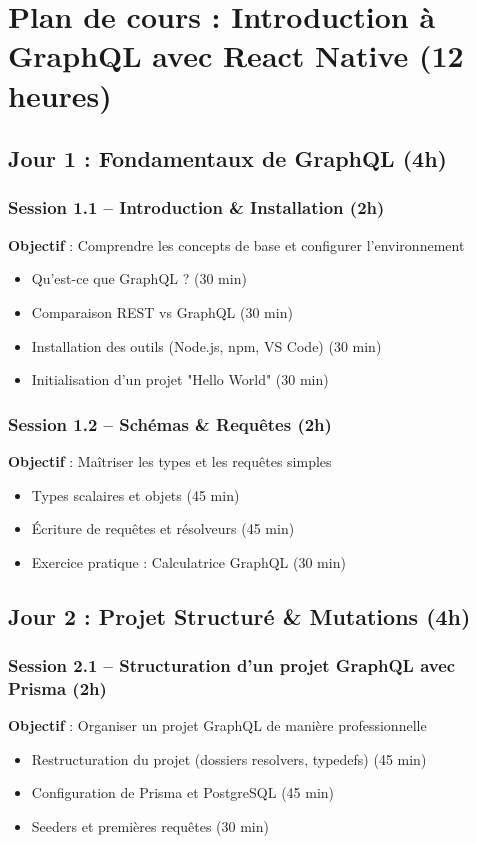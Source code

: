 \documentclass[12pt]{article}
\begin{document}
\section*{Plan de cours : Introduction à GraphQL avec React Native (12 heures)}

\subsection*{Jour 1 : Fondamentaux de GraphQL (4h)}

\subsubsection*{Session 1.1 – Introduction \& Installation (2h)}
\textbf{Objectif} : Comprendre les concepts de base et configurer l'environnement
\begin{itemize}
  \item Qu'est-ce que GraphQL ? (30 min)
  \item Comparaison REST vs GraphQL (30 min)
  \item Installation des outils (Node.js, npm, VS Code) (30 min)
  \item Initialisation d'un projet "Hello World" (30 min)
\end{itemize}

\vspace{0.3cm}
\subsubsection*{Session 1.2 – Schémas \& Requêtes (2h)}
\textbf{Objectif} : Maîtriser les types et les requêtes simples
\begin{itemize}
  \item Types scalaires et objets (45 min)
  \item Écriture de requêtes et résolveurs (45 min)
  \item Exercice pratique : Calculatrice GraphQL (30 min)
\end{itemize}

\vspace{0.5cm}
\subsection*{Jour 2 : Projet Structuré \& Mutations (4h)}

\subsubsection*{Session 2.1 – Structuration d’un projet GraphQL avec Prisma (2h)}
\textbf{Objectif} : Organiser un projet GraphQL de manière professionnelle
\begin{itemize}
  \item Restructuration du projet (dossiers resolvers, typedefs) (45 min)
  \item Configuration de Prisma et PostgreSQL (45 min)
  \item Seeders et premières requêtes (30 min)
\end{itemize}
\end{document}

